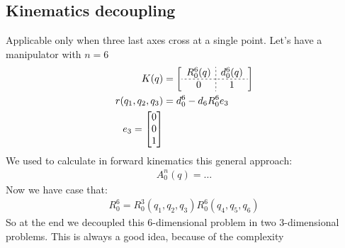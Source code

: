 \documentclass[12pt, a4paper]{extarticle}
\begin{document}
	\subsection{Kinematics decoupling}
	Applicable only when three last axes cross at a single point.
	Let's have a manipulator with $n = 6$
	\begin{align}
		K(q) &=
		\left[
		\begin{array}{c;{2pt/2pt}c}
			R_0^6(q)  & d_0^6(q) \\ \hdashline[2pt/2pt]
			0 & 1
		\end{array}
		\right]\\
		r(q_1, q_2, q_3) &= d_0^6 - d_6 R_0^6 e_3 \\
		e_3 = \begin{bmatrix}
			0 \\ 0 \\ 1
		\end{bmatrix}
	\end{align}
	We used to calculate in forward kinematics this general approach:
	\begin{align}
		A_0^n(q) = \dots
	\end{align}
	Now we have case that:
	\begin{align}
		R_0^6 = R_0^3(q_1, q_2, q_3) R_0^6(q_4, q_5, q_6)
	\end{align}
	So at the end we decoupled this 6-dimensional problem in two 3-dimensional problems. This is always a good idea, because of the complexity
\end{document}
